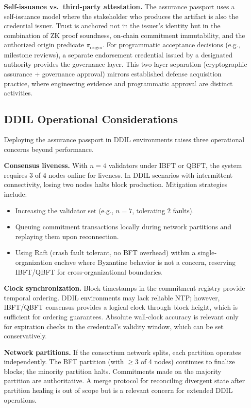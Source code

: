 \textbf{Self-issuance vs.\ third-party attestation.}
The assurance passport uses a self-issuance model where the stakeholder who produces the artifact is also the credential issuer.
Trust is anchored not in the issuer's identity but in the combination of ZK proof soundness, on-chain commitment immutability, and the authorized origin predicate $\pi_{\text{origin}}$.
For programmatic acceptance decisions (e.g., milestone reviews), a separate endorsement credential issued by a designated authority provides the governance layer.
This two-layer separation (cryptographic assurance + governance approval) mirrors established defense acquisition practice, where engineering evidence and programmatic approval are distinct activities.

\subsection{DDIL Operational Considerations}
\label{sec:discussion-ddil}

Deploying the assurance passport in DDIL environments raises three operational concerns beyond performance.

\textbf{Consensus liveness.}
With $n=4$ validators under IBFT or QBFT, the system requires 3 of 4 nodes online for liveness.
In DDIL scenarios with intermittent connectivity, losing two nodes halts block production.
Mitigation strategies include:
\begin{itemize}
    \item Increasing the validator set (e.g., $n=7$, tolerating 2 faults).
    \item Queuing commitment transactions locally during network partitions and replaying them upon reconnection.
    \item Using Raft (crash fault tolerant, no BFT overhead) within a single-organization enclave where Byzantine behavior is not a concern, reserving IBFT/QBFT for cross-organizational boundaries.
\end{itemize}

\textbf{Clock synchronization.}
Block timestamps in the commitment registry provide temporal ordering.
DDIL environments may lack reliable NTP; however, IBFT/QBFT consensus provides a logical clock through block height, which is sufficient for ordering guarantees.
Absolute wall-clock accuracy is relevant only for expiration checks in the credential's validity window, which can be set conservatively.

\textbf{Network partitions.}
If the consortium network splits, each partition operates independently.
The BFT partition (with $\geq 3$ of 4 nodes) continues to finalize blocks; the minority partition halts.
Commitments made on the majority partition are authoritative.
A merge protocol for reconciling divergent state after partition healing is out of scope but is a relevant concern for extended DDIL operations.

